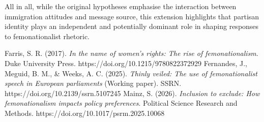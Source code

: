 \documentclass[12pt,letterpaper]{article}
\begin{document}
		All in all, while the original hypotheses emphasise the interaction between immigration attitudes and message source, this extension highlights that partisan identity plays an independent and potentially dominant role in shaping responses to femonationalist rhetoric.
		\newpage
		\begin{thebibliography}{}
			Farris, S. R. (2017).
			\textit{In the name of women’s rights: The rise of femonationalism}.
			Duke University Press.
			https://doi.org/10.1215/9780822372929
			Fernandes, J., Meguid, B. M., \& Weeks, A. C. (2025).
			\textit{Thinly veiled: The use of femonationalist speech in European parliaments}
			(Working paper). SSRN.
			https://doi.org/10.2139/ssrn.5107245
			Mainz, S. (2026).
			\textit{Inclusion to exclude: How femonationalism impacts policy preferences}.
			Political Science Research and Methods.
			https://doi.org/10.1017/psrm.2025.10068
		\end{thebibliography}
\end{document}
